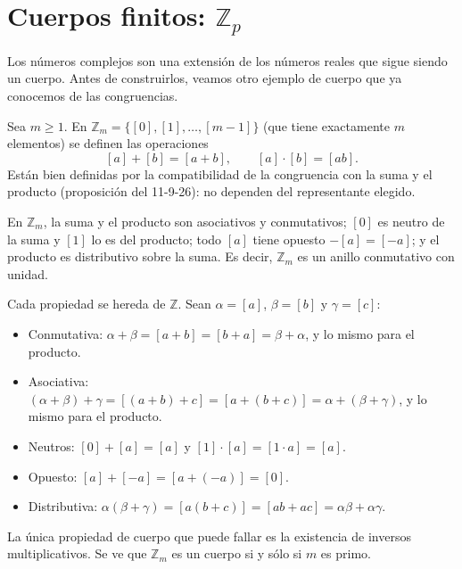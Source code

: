 \section{Cuerpos finitos: $\mathbb{Z}_p$}

Los números complejos son una extensión de los números reales que sigue siendo un
cuerpo. Antes de construirlos, veamos otro ejemplo de cuerpo que ya conocemos de
las congruencias.

\begin{definicion}
Sea $m\ge 1$. En $\mathbb{Z}_m=\{[0],[1],\dots,[m-1]\}$ (que tiene exactamente $m$
elementos) se definen las operaciones
\[
[a]+[b]=[a+b], \qquad [a]\cdot[b]=[ab].
\]
Están bien definidas por la compatibilidad de la congruencia con la suma y el
producto (proposición del 11-9-26): no dependen del representante elegido.
\end{definicion}

\begin{proposicion}
En $\mathbb{Z}_m$, la suma y el producto son asociativos y conmutativos; $[0]$ es
neutro de la suma y $[1]$ lo es del producto; todo $[a]$ tiene opuesto
$-[a]=[-a]$; y el producto es distributivo sobre la suma. Es decir, $\mathbb{Z}_m$
es un anillo conmutativo con unidad.
\end{proposicion}

\begin{demostracion}
Cada propiedad se hereda de $\mathbb{Z}$. Sean $\alpha=[a]$, $\beta=[b]$ y
$\gamma=[c]$:
\begin{itemize}
    \item Conmutativa: $\alpha+\beta=[a+b]=[b+a]=\beta+\alpha$, y lo mismo para el
    producto.
    \item Asociativa: $(\alpha+\beta)+\gamma=[(a+b)+c]=[a+(b+c)]=\alpha+(\beta+\gamma)$,
    y lo mismo para el producto.
    \item Neutros: $[0]+[a]=[a]$ y $[1]\cdot[a]=[1\cdot a]=[a]$.
    \item Opuesto: $[a]+[-a]=[a+(-a)]=[0]$.
    \item Distributiva: $\alpha(\beta+\gamma)=[a(b+c)]=[ab+ac]=\alpha\beta+\alpha\gamma$.
\end{itemize}
\end{demostracion}

\begin{nota}
La única propiedad de cuerpo que puede fallar es la existencia de inversos
multiplicativos. Se ve que $\mathbb{Z}_m$ es un cuerpo si y sólo si $m$ es primo.
\end{nota}

